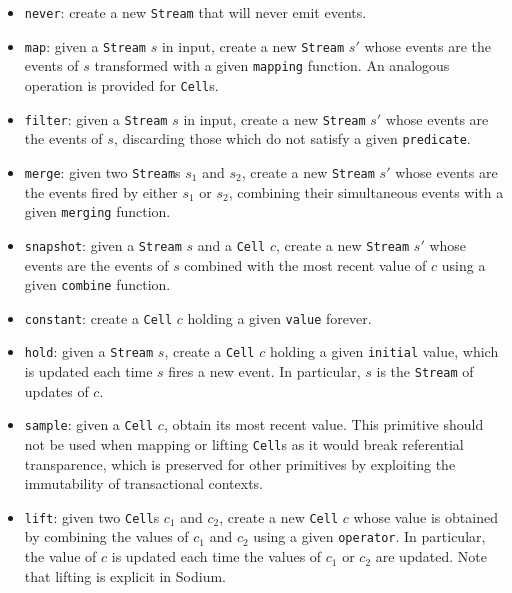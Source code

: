 \begin{itemize}
  \item \texttt{never}: create a new \texttt{Stream} that will never emit
        events.
  \item \texttt{map}: given a \texttt{Stream} $s$ in input, create a new
        \texttt{Stream} $s'$ whose events are the events of $s$ transformed
        with a given \texttt{mapping} function. An analogous operation is
        provided for \texttt{Cell}s.
  \item \texttt{filter}: given a \texttt{Stream} $s$ in input, create a new
        \texttt{Stream} $s'$ whose events are the events of $s$, discarding
        those which do not satisfy a given \texttt{predicate}.
  \item \texttt{merge}: given two \texttt{Stream}s $s_1$ and $s_2$, create a
        new \texttt{Stream} $s'$ whose events are the events fired by either
        $s_1$ or $s_2$, combining their simultaneous events with a given
        \texttt{merging} function.
  \item \texttt{snapshot}: given a \texttt{Stream} $s$ and a \texttt{Cell} $c$,
        create a new \texttt{Stream} $s'$ whose events are the events of $s$
        combined with the most recent value of $c$ using a given
        \texttt{combine} function.
  \item \texttt{constant}: create a \texttt{Cell} $c$ holding a given
        \texttt{value} forever.
  \item \texttt{hold}: given a \texttt{Stream} $s$, create a \texttt{Cell} $c$
        holding a given \texttt{initial} value, which is updated each time $s$
        fires a new event. In particular, $s$ is the \texttt{Stream} of updates
        of $c$.
  \item \texttt{sample}: given a \texttt{Cell} $c$, obtain its most recent
        value. This primitive should not be used when mapping or lifting
        \texttt{Cell}s as it would break referential transparence, which is
        preserved for other primitives by exploiting the immutability of
        transactional contexts.
  \item \texttt{lift}: given two \texttt{Cell}s $c_1$ and $c_2$, create a new
        \texttt{Cell} $c$ whose value is obtained by combining the values of
        $c_1$ and $c_2$ using a given \texttt{operator}. In particular,
        the value of $c$ is updated each time the values of $c_1$ or $c_2$ are
        updated. Note that lifting is explicit in Sodium.
\end{itemize}

